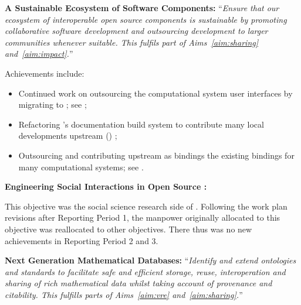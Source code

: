 \begin{compactenum}[\bf {Obj} 1\rm]
\item \label{objective:sustainable}
  \textbf{A Sustainable Ecosystem of Software Components:}
  ``\emph{Ensure that our ecosystem of
  interoperable open source components is \emph{sustainable} by
  promoting collaborative software development and outsourcing
  development to larger communities whenever suitable. This fulfils
  part of Aims~\ref{aim:sharing} and~\ref{aim:impact}.}''


  Achievements include:
  \begin{itemize}
  \item Continued work on outsourcing the computational system user
    interfaces by migrating to \Jupyter; see ;
  \item Refactoring \Sage's documentation build system to contribute many local developments
    upstream (\Sphinx) ;
  \item Outsourcing and contributing upstream as \Python bindings the existing \Sage
    bindings for many computational systems; see .
  \end{itemize}

\begingroup
\color{gray}
\item \label{objective:social}
  \textbf{Engineering Social Interactions in Open Source \VRE:}

  This objective was the social science research side of
  . Following the work plan revisions after
  Reporting Period 1, the manpower originally allocated to this
  objective was reallocated to other objectives. There thus was no new
  achievements in Reporting Period 2 and 3.

\endgroup

\item \label{objective:data}
  \textbf{Next Generation Mathematical Databases:}
  ``\emph{Identify and extend ontologies and
  standards to facilitate safe and efficient storage, reuse,
  interoperation and sharing of rich mathematical data whilst taking
  account of provenance and citability. This fulfills parts of
  Aims~\ref{aim:vre} and~\ref{aim:sharing}.}''



\end{compactenum}
